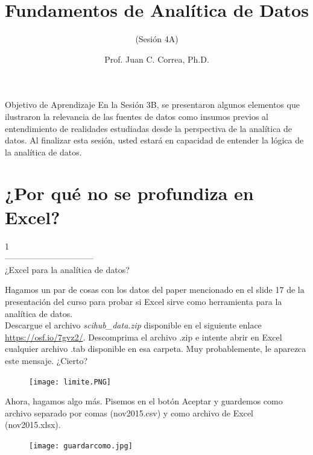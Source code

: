 \documentclass[aspectratio=169]{beamer}
\title[Fundamentos de Analítica de Datos]{Fundamentos de Analítica de Datos}
\subtitle{(Sesión 4A)}
\author[Prof. Juan C. Correa, Ph.D.]{Prof. Juan C. Correa, Ph.D.}
\institute[]{
Colegio de Estudios Superiores de Administración\\
Bogotá - Colombia\\
}
\date[Bogotá, Agosto, 2021] %
{}
\begin{document}
\begin{frame}
\titlepage
\end{frame}


\begin{frame}
\begin{block}{Objetivo de Aprendizaje}
En la Sesión 3B, se presentaron algunos elementos que ilustraron la relevancia de las fuentes de datos como insumos previos al entendimiento de realidades estudiadas desde la perspectiva de la analítica de datos. Al finalizar esta sesión, usted estará en capacidad de entender la lógica de la analítica de datos.
\end{block}
\end{frame}

\section{¿Por qué no se profundiza en Excel?}
\begin{frame}
\begin{center}
\Huge
\textcolor{azulcesaclaro}{1\\
--------------------------------\\
¿Excel para la analítica de datos?}
\end{center}
\end{frame}

\begin{frame}
Hagamos un par de cosas con los datos del paper mencionado en el slide 17 de la presentación del curso para probar si Excel sirve como herramienta para la analítica de datos. \\
\vspace{0.3cm}
Descargue el archivo \textit{scihub\_data.zip} disponible en el siguiente enlace \textcolor{blue}{\url{https://osf.io/7gvz2/}}. Descomprima el archivo .zip e intente abrir en Excel cualquier archivo .tab disponible en esa carpeta. Muy probablemente, le aparezca este mensaje. ¿Cierto?\\
\begin{figure}
\centering
\texttt{[image: limite.PNG]}
\end{figure}
\end{frame}

\begin{frame}
Ahora, hagamos algo más. Pisemos en el botón Aceptar y guardemos como archivo separado por comas (nov2015.csv) y como archivo de Excel (nov2015.xlsx).
\begin{figure}
\centering
\texttt{[image: guardarcomo.jpg]}
\end{figure}
\end{frame}
\end{document}
